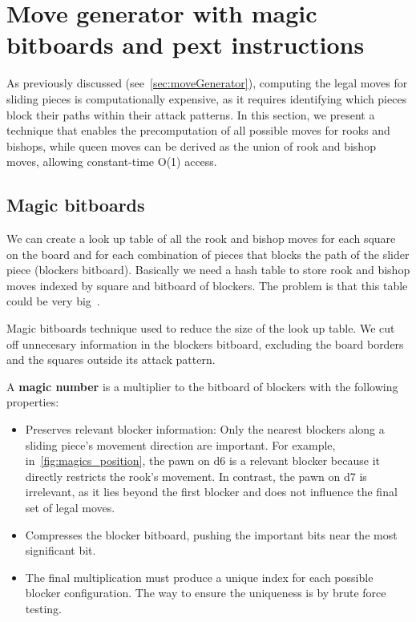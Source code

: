 \section{Move generator with magic bitboards and pext instructions}

As previously discussed (see~\cref{sec:moveGenerator}), computing the legal moves for sliding pieces is computationally expensive, as it requires identifying which pieces block their paths within their attack patterns. In this section, we present a technique that enables the precomputation of all possible moves for rooks and bishops, while queen moves can be derived as the union of rook and bishop moves, allowing constant-time O(1) access.

\subsection*{Magic bitboards}

We can create a look up table of all the rook and bishop moves for each square on the board and for each combination of pieces that blocks the path of the slider piece (blockers  bitboard). Basically we need a hash table to store rook and bishop moves indexed by square and bitboard of blockers. The problem is that this table could be very big~\cite{MagicBitboards}.

\vspace{1em}

\noindent Magic bitboards technique used to reduce the size of the look up table. We cut off unnecesary information in the blockers bitboard, excluding the board borders and the squares outside its attack pattern.

\vspace{1em}

\noindent A \textbf{magic number} is a multiplier to the bitboard of blockers with the following properties:

\begin{itemize}[itemsep=1pt]
  \item Preserves relevant blocker information: 
    Only the nearest blockers along a sliding piece's movement direction are important. For example, in~\cref{fig:magics_position}, the pawn on d6 is a relevant blocker because it directly restricts the rook's movement. In contrast, the pawn on d7 is irrelevant, as it lies beyond the first blocker and does not influence the final set of legal moves.

  \item Compresses the blocker bitboard, pushing the important bits near the most significant bit.
  \item The final multiplication must produce a unique index for each possible blocker configuration. The way to ensure the uniqueness is by brute force testing.
\end{itemize}


